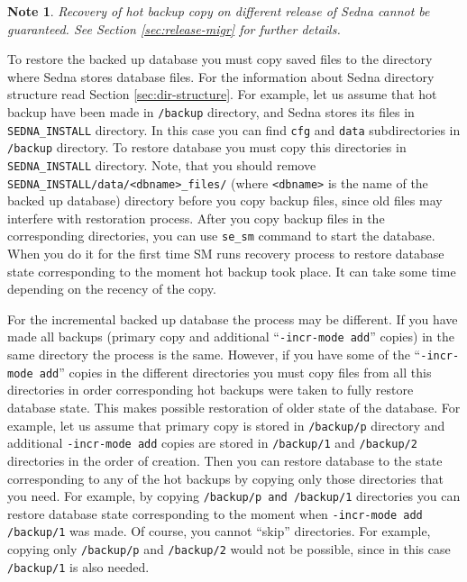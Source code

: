 \documentclass[a4paper,12pt]{article}
\newtheorem{note}{Note}    %
\begin{document}
\begin{note}
Recovery of hot backup copy on different release of Sedna cannot be guaranteed.
See Section \ref{sec:release-migr} for further details.
\end{note}

To restore the backed up database you must copy saved files to the directory
where Sedna stores database files. For the information about Sedna directory
structure read Section \ref{sec:dir-structure}. For example, let us assume that
hot backup have been made in \verb!/backup! directory, and Sedna stores its
files in \verb!SEDNA_INSTALL! directory. In this case you can find \verb!cfg!
and \verb!data! subdirectories in \verb!/backup! directory. To restore database
you must copy this directories in \verb!SEDNA_INSTALL! directory. Note, that you
should remove \verb!SEDNA_INSTALL/data/<dbname>_files/! (where \verb!<dbname>!
is the name of the backed up database) directory before you copy backup files,
since old files may interfere with restoration process. After you copy backup
files in the corresponding directories, you can use \verb!se_sm! command to
start the database. When you do it for the first time SM runs recovery process
to restore database state corresponding to the moment hot backup took place. It
can take some time depending on the recency of the copy.

For the incremental backed up database the process may be different. If you have
made all backups (primary copy and additional ``\verb!-incr-mode add!'' copies)
in the same directory the process is the same. However, if you have some of the
``\verb!-incr-mode add!'' copies in the different directories you must copy
files from all this directories in order corresponding hot backups were taken to
fully restore database state. This makes possible restoration of older state of
the database. For example, let us assume that primary copy is stored in
\verb!/backup/p! directory and additional \verb!-incr-mode add! copies are
stored in \verb!/backup/1! and \verb!/backup/2! directories in the order of
creation. Then you can restore database to the state corresponding to any of the
hot backups by copying only those directories that you need. For example, by
copying \verb!/backup/p and !\verb!/backup/1! directories you can restore
database state corresponding to the moment when \verb!-incr-mode add /backup/1!
was made. Of course, you cannot ``skip'' directories. For example, copying only
\verb!/backup/p! and \verb!/backup/2! would not be possible, since in this case
\verb!/backup/1! is also needed.
\end{document}
